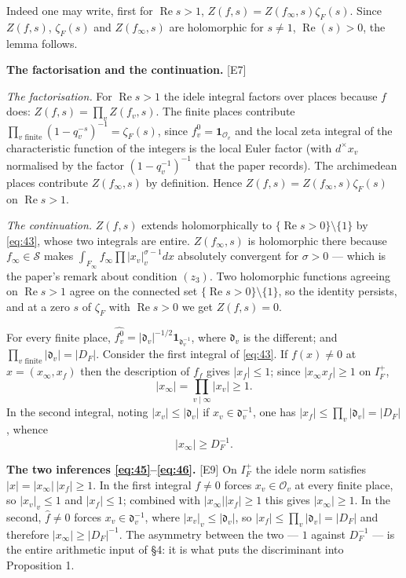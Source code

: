 \documentclass[11pt,reqno]{amsart}
\theoremstyle{plain}
\theoremstyle{definition}
\theoremstyle{remark}
\newcommand{\Ss}{\mathcal{S}}
\newcommand{\fh}{\widehat{f}}
\newcommand{\Ledger}[1]{{\scriptsize\textsf{[#1]}}}
\begin{document}
Indeed one may write, first for $\operatorname{Re}s>1$,
$Z(f,s)=Z(f_\infty,s)\zeta_F(s)$. Since $Z(f,s)$, $\zeta_F(s)$ and $Z(f_\infty,s)$ are
holomorphic for $s\ne1$, $\operatorname{Re}(s)>0$, the lemma follows.

\begin{filled}
\textbf{The factorisation and the continuation.} \Ledger{E7}

\emph{The factorisation.} For $\operatorname{Re}s>1$ the idele integral factors over
places because $f$ does: $Z(f,s)=\prod_vZ(f_v,s)$. The finite places contribute
$\prod_{v\text{ finite}}(1-q_v^{-s})^{-1}=\zeta_F(s)$, since
$f_v^0=\mathbf 1_{\mathcal O_v}$ and the local zeta integral of the characteristic
function of the integers is the local Euler factor (with $d^\times x_v$ normalised by
the factor $(1-q_v^{-1})^{-1}$ that the paper records). The archimedean places
contribute $Z(f_\infty,s)$ by definition. Hence
$Z(f,s)=Z(f_\infty,s)\zeta_F(s)$ on $\operatorname{Re}s>1$.

\emph{The continuation.} $Z(f,s)$ extends holomorphically to $\{\operatorname{Re}s>0\}
\setminus\{1\}$ by \eqref{eq:43}, whose two integrals are entire. $Z(f_\infty,s)$ is
holomorphic there because $f_\infty\in\Ss$ makes
$\int_{F_\infty}f_\infty\prod|x_v|_v^{\sigma-1}dx$ absolutely convergent for
$\sigma>0$ --- which is the paper's remark about condition $(z_3)$. Two holomorphic
functions agreeing on $\operatorname{Re}s>1$ agree on the connected set
$\{\operatorname{Re}s>0\}\setminus\{1\}$, so the identity persists, and at a zero $s$
of $\zeta_F$ with $\operatorname{Re}s>0$ we get $Z(f,s)=0$.
\end{filled}

For every finite place, $\widehat{f_v^0}=|\mathfrak d_v|^{-1/2}\mathbf
1_{\mathfrak d_v^{-1}}$, where $\mathfrak d_v$ is the different; and
$\prod_{v\text{ finite}}|\mathfrak d_v|=|D_F|$. Consider the first integral of
\eqref{eq:43}. If $f(x)\ne0$ at $x=(x_\infty,x_f)$ then the description of $f_f$ gives
$|x_f|\le1$; since $|x_\infty x_f|\ge1$ on $I_F^+$,
\begin{equation}\label{eq:45}
 |x_\infty|=\prod_{v\mid\infty}|x_v|\ge1 .
\end{equation}
In the second integral, noting $|x_v|\le|\mathfrak d_v|$ if
$x_v\in\mathfrak d_v^{-1}$, one has $|x_f|\le\prod_v|\mathfrak d_v|=|D_F|$, whence
\begin{equation}\label{eq:46}
 |x_\infty|\ge D_F^{-1} .
\end{equation}

\begin{expansion}
\textbf{The two inferences \eqref{eq:45}--\eqref{eq:46}.} \Ledger{E9} On $I_F^+$ the
idele norm satisfies $|x|=|x_\infty|\,|x_f|\ge1$. In the first integral $f\ne0$ forces
$x_v\in\mathcal O_v$ at every finite place, so $|x_v|_v\le1$ and $|x_f|\le1$;
combined with $|x_\infty||x_f|\ge1$ this gives $|x_\infty|\ge1$. In the second, $\fh\ne0$
forces $x_v\in\mathfrak d_v^{-1}$, where $|x_v|_v\le|\mathfrak d_v|$, so
$|x_f|\le\prod_v|\mathfrak d_v|=|D_F|$ and therefore $|x_\infty|\ge|D_F|^{-1}$. The
asymmetry between the two --- $1$ against $D_F^{-1}$ --- is the entire arithmetic
input of \S4: it is what puts the discriminant into Proposition 1.
\end{expansion}
\end{document}

